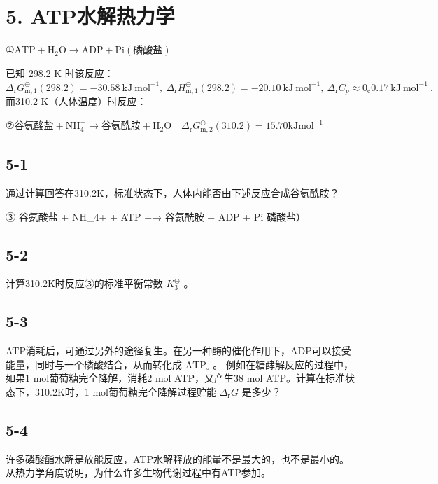 \section*{5. ATP水解热力学}
$
① \mathrm{ATP} + \mathrm{H} _ {2} \mathrm{O} \rightarrow \mathrm{ADP} + \mathrm{Pi} (\text {磷酸盐})
$

已知 298.2 K 时该反应： $\Delta _ { \mathrm { r } } G _ { \mathrm { m , 1 } } ^ { \ominus } ( 2 9 8 . 2 ) = - 3 0 . 5 8 \mathrm { ~ k J ~ m o l ^ { - 1 } , ~ } \Delta _ { \mathrm { r } } H _ { \mathrm { m , 1 } } ^ { \ominus } ( 2 9 8 . 2 ) = - 2 0 . 1 0 \mathrm { ~ k J ~ m o l ^ { - 1 } , ~ } \Delta _ { \mathrm { r } } C _ { p } \approx 0 _ { \mathrm { c } } 0 . 1 7 \mathrm { ~ k J ~ m o l ^ { - 1 } ~ } .$ ⽽310.2 K（⼈体温度）时反应：

$
② \text {谷氨酸盐} + \mathrm{NH} _ {4} ^ {+} \rightarrow \text {谷氨酰胺} + \mathrm{H} _ {2} \mathrm{O} \quad \Delta_ {\mathrm{r}} G _ {\mathrm{m}, 2} ^ {\ominus} (3 1 0. 2) = 1 5. 7 0 \mathrm{kJ} \mathrm{mol} ^ {- 1}
$

\subsection*{5-1}
通过计算回答在310.2K，标准状态下，⼈体内能否由下述反应合成⾕氨酰胺？

③ ⾕氨酸盐 + NH_{4}+ + ATP +→ ⾕氨酰胺 + ADP + Pi 磷酸盐）

\subsection*{5-2}
计算310.2K时反应③的标准平衡常数 $K _ { 3 } ^ { \ominus }$ 。

\subsection*{5-3}
ATP消耗后，可通过另外的途径复⽣。在另⼀种酶的催化作⽤下，ADP可以接受能量，同时与⼀个磷酸结合，从⽽转化成 $\mathrm { A T P _ { \circ } }$ 。 例如在糖酵解反应的过程中，如果1 mol葡萄糖完全降解，消耗2 mol ATP，⼜产⽣38 mol ATP。计算在标准状态下，310.2K时，1 mol葡萄糖完全降解过程贮能 $\Delta _ { \mathrm { r } } G$ 是多少？

\subsection*{5-4}
许多磷酸酯⽔解是放能反应，ATP⽔解释放的能量不是最⼤的，也不是最⼩的。从热⼒学⻆度说明，为什么许多⽣物代谢过程中有ATP参加。
